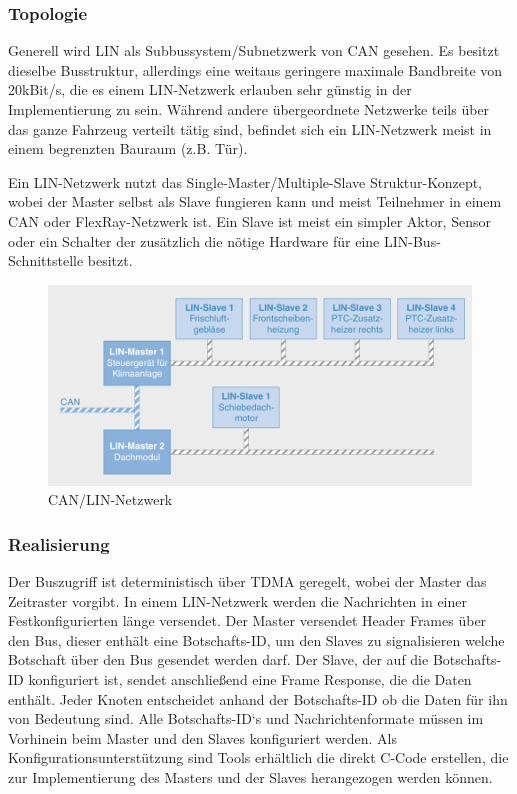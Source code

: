     \subsubsection{Topologie}
    Generell wird LIN als Subbussystem/Subnetzwerk von CAN gesehen. Es besitzt dieselbe
    Busstruktur, allerdings eine weitaus geringere maximale Bandbreite von 20kBit/s, 
    die es einem LIN-Netzwerk erlauben sehr günstig in der Implementierung zu sein.
    Während andere übergeordnete Netzwerke teils über das ganze Fahrzeug verteilt tätig sind,
    befindet sich ein LIN-Netzwerk meist in einem begrenzten Bauraum (z.B. Tür).
    ~\cite{reif2011bosch}

    Ein LIN-Netzwerk nutzt das Single-Master/Multiple-Slave Struktur-Konzept, wobei der Master
    selbst als Slave fungieren kann und meist Teilnehmer in einem CAN oder FlexRay-Netzwerk ist.
    Ein Slave ist meist ein simpler Aktor, Sensor oder ein Schalter der zusätzlich die nötige Hardware 
    für eine LIN-Bus-Schnittstelle besitzt.
    ~\cite{reif2011bosch}
    ~\cite{LA_LIN1}
    
    \begin{figure}[h!]
        \includegraphics[width=\linewidth]{./images/Kapitel4/LIN_Bus.png}
        \caption[
            Bosch Autoelektrik und Autoelektronik S.111 \cite{reif2011bosch}]
            {CAN/LIN-Netzwerk}
    \end{figure}

    \subsubsection{Realisierung}

    Der Buszugriff ist deterministisch über TDMA geregelt, wobei der Master das Zeitraster vorgibt.
    In einem LIN-Netzwerk werden die Nachrichten in einer Festkonfigurierten länge versendet.
    Der Master versendet Header Frames über den Bus, dieser enthält eine Botschafts-ID, um 
    den Slaves zu signalisieren welche Botschaft über den Bus gesendet werden darf. Der Slave,
    der auf die Botschafts-ID konfiguriert ist, sendet anschließend eine Frame Response, die die 
    Daten enthält. Jeder Knoten entscheidet anhand der Botschafts-ID ob die Daten für 
    ihn von Bedeutung sind.
    Alle Botschafts-ID‘s und Nachrichtenformate müssen im Vorhinein beim
    Master und den Slaves konfiguriert werden. Als Konfigurationsunterstützung sind Tools 
    erhältlich die direkt C-Code erstellen, die zur Implementierung des Masters und der Slaves
    herangezogen werden können.~\cite{LA_LIN1}\cite{LA_LDF-Tool}

